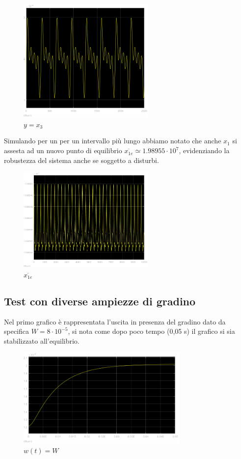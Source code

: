 \documentclass{article}
\begin{document}
\begin{figure}[!h]
    \centering
     \includegraphics[width=0.6\textwidth]{grafici/x3_2.png}
     \caption*{$y=x_3$}
\end{figure}
\noindent
Simulando per un per un intervallo più lungo abbiamo notato che anche $x_1$ si assesta ad un nuovo punto di equilibrio $\overline{x_{1e}}\simeq1.98955\cdot10^7$, evidenziando la robustezza del sistema anche se soggetto a disturbi.

\begin{figure}[!h]
    \centering
     \includegraphics[width=0.6\textwidth]{grafici/x1_1_e.png}
     \caption*{$\overline{x_{1e}}$}
\end{figure}

\subsection{Test con diverse ampiezze di gradino}
\noindent
Nel primo grafico è rappresentata l'uscita in presenza del gradino dato da specifica $W=8\cdot10^{-5}$, si nota come dopo poco tempo (0,05 s) il grafico si sia stabilizzato all'equilibrio.



\begin{figure}[!h]
    \centering
     \includegraphics[width=0.75\textwidth]{grafici/gradino_W.png}
     \caption*{$w(t)=W$}
\end{figure}
\end{document}
